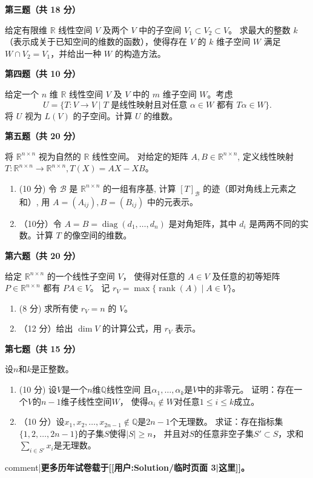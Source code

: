 \textbf{第三题（共 18 分）}

\qquad 给定有限维 $\mathbb{R}$ 线性空间 $V$ 及两个 $V$ 中的子空间 $V_{1} \subset V_{2} \subset V$。
求最大的整数 $k$ （表示成关于已知空间的维数的函数），使得存在 $V$ 的 $k$ 维子空间 $W$ 满足 $W \cap V_{2}=V_{1}$，并给出一种 $W$ 的构造方法。

\textbf{第四题（共 10 分）}

\qquad 给定一个 $n$ 维 $\mathbb{R}$ 线性空间 $V$ 及 $V$ 中的 $m$ 维子空间 $W$。考虑
\[U=\{T: V \rightarrow V \mid T \text { 是线性映射且对任意 } \alpha \in W \text { 都有 } T \alpha \in W\} .\]
\qquad 将 $U$ 视为 $L(V)$ 的子空间。计算 $U$ 的维数。

\textbf{第五题（共 20 分）}

\qquad 将 $\mathbb{R}^{n \times n}$ 视为自然的 $\mathbb{R}$ 线性空间。
对给定的矩阵 $A, B \in \mathbb{R}^{n \times n}$,
定义线性映射 $T: \mathbb{R}^{n \times n} \rightarrow \mathbb{R}^{n \times n}, T(X)=A X-X B$。
\begin{enumerate}
  \item (10 分) 令 $\mathcal{B}$ 是 $\mathbb{R}^{n \times n}$ 的一组有序基, 
  计算 $[T]_{\mathcal{B}}$ 的迹（即对角线上元素之和）,
  用 $A=(A_{i j}), B=(B_{i j})$ 中的元表示。
  \item（10分）令 $A=B=\operatorname{diag}(d_{1}, \ldots, d_{n})$ 是对角矩阵，其中 $d_{i}$ 是两两不同的实数。计算 $T$ 的像空间的维数。
\end{enumerate}

\textbf{第六题（共 20 分）}

\qquad 给定 $\mathbb{R}^{n \times n}$ 的一个线性子空间 $V$，
使得对任意的 $A \in V$ 及任意的初等矩阵 $P \in \mathbb{R}^{n \times n}$ 都有 $P A \in V$。
记 $r_{V}=\max \{\operatorname{rank}(A) \mid A \in V\}$。
\begin{enumerate}
  \item (8 分) 求所有使 $r_{V}=n$ 的 $V$。
  \item（12 分）给出 $\operatorname{dim} V$ 的计算公式，用 $r_{V}$ 表示。
\end{enumerate}

\textbf{第七题（共 15 分）}

\qquad 设$n$和$k$是正整数。
\begin{enumerate}
  \item (10 分) 设$V$是一个$n$维$\mathbb{Q}$线性空间
  且$\alpha_1,\dots,\alpha_k$是$V$中的非零元。
  证明：存在一个$V$的$n-1$维子线性空间$W$，
  使得$\alpha_i \notin W$对任意$1 \le i \le k$成立。
  \item（10 分）设$x_1,x_2,\dots,x_{2n-1}\notin\mathbb{Q}$是$2n-1$个无理数。
  求证：存在指标集$\{1,2,\dots,2n-1\}$的子集$S$使得$|S| \ge n$，
  并且对$S$的任意非空子集$S' \subset S$，求和$\sum_{i \in S'}x_i$是无理数。
\end{enumerate}


{{comment|\textbf{更多历年试卷载于[[用户:Solution/临时页面 3|这里]]。}}}